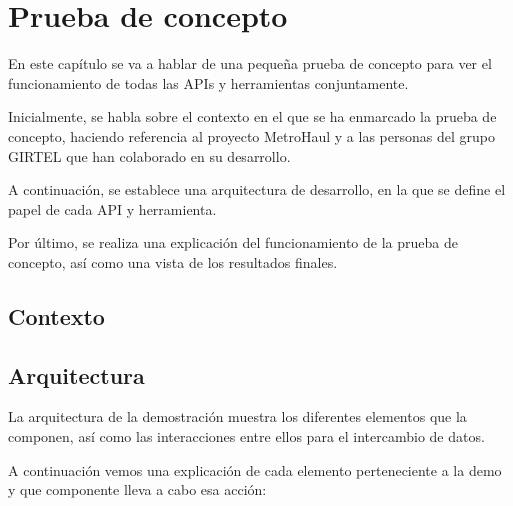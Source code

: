 \chapter{Prueba de concepto}

En este capítulo se va a hablar de una pequeña prueba de concepto para ver el funcionamiento de todas las APIs y herramientas conjuntamente.

Inicialmente, se habla sobre el contexto en el que se ha enmarcado la prueba de concepto, haciendo referencia al proyecto MetroHaul y a las personas del grupo GIRTEL que han colaborado en su desarrollo.

A continuación, se establece una arquitectura de desarrollo, en la que se define el papel de cada API y herramienta.

Por último, se realiza una explicación del funcionamiento de la prueba de concepto, así como una vista de los resultados finales.

\section{Contexto}
\label{sec:contexto}

\section{Arquitectura}
\label{sec:arquitectura}

La arquitectura de la demostración muestra los diferentes elementos que la componen, así como las interacciones entre ellos para el intercambio de datos.

A continuación vemos una explicación de cada elemento perteneciente a la demo y que componente lleva a cabo esa acción:

